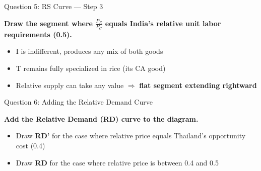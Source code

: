 \documentclass{beamer}
\begin{document}
\begin{frame}{Question 5: RS Curve --- Step 3}

\textbf{Draw the segment where $\frac{P_R}{P_C}$ equals India's relative unit labor requirements (0.5).}

\vspace{0.1cm}

\centering
{}

\begin{itemize}
    \item I is indifferent, produces any mix of both goods
    \item T remains fully specialized in rice (its CA good)
    \item Relative supply can take any value $\Rightarrow$ \textbf{flat segment extending rightward}
\end{itemize}

\end{frame}



\begin{frame}{Question 6: Adding the Relative Demand Curve}

\textbf{Add the Relative Demand (RD) curve to the diagram.}

\vspace{0.3cm}

\begin{itemize}
    \item Draw \textbf{RD'} for the case where relative price equals Thailand's opportunity cost (0.4)
    \item Draw \textbf{RD} for the case where relative price is between 0.4 and 0.5
\end{itemize}

\end{frame}
\end{document}
